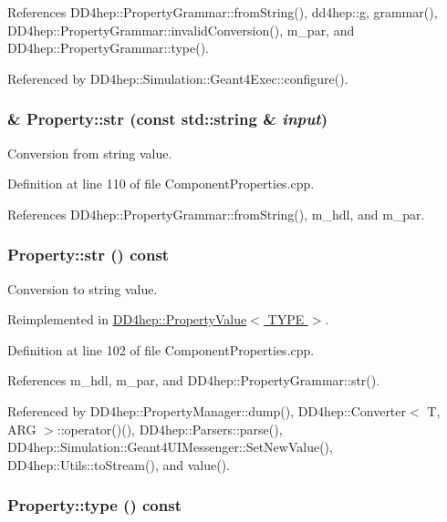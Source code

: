 References DD4hep::PropertyGrammar::fromString(), dd4hep::g, grammar(), DD4hep::PropertyGrammar::invalidConversion(), m\_\-par, and DD4hep::PropertyGrammar::type().

Referenced by DD4hep::Simulation::Geant4Exec::configure().\hypertarget{class_d_d4hep_1_1_property_a4f4d25269959d15fb6b6c9cf581ee2a4}{
\subsubsection[{str}]{ \& Property::str (const std::string \& {\em input})}}
\label{class_d_d4hep_1_1_property_a4f4d25269959d15fb6b6c9cf581ee2a4}


Conversion from string value. 

Definition at line 110 of file ComponentProperties.cpp.

References DD4hep::PropertyGrammar::fromString(), m\_\-hdl, and m\_\-par.\hypertarget{class_d_d4hep_1_1_property_aed04b1176882fe335eb03a2044bc1cf2}{
\subsubsection[{str}]{ Property::str () const}}
\label{class_d_d4hep_1_1_property_aed04b1176882fe335eb03a2044bc1cf2}


Conversion to string value. 

Reimplemented in \hyperlink{class_d_d4hep_1_1_property_value_aee9a0afd8a49155741da905fdadbbc91}{DD4hep::PropertyValue$<$ TYPE $>$}.

Definition at line 102 of file ComponentProperties.cpp.

References m\_\-hdl, m\_\-par, and DD4hep::PropertyGrammar::str().

Referenced by DD4hep::PropertyManager::dump(), DD4hep::Converter$<$ T, ARG $>$::operator()(), DD4hep::Parsers::parse(), DD4hep::Simulation::Geant4UIMessenger::SetNewValue(), DD4hep::Utils::toStream(), and value().\hypertarget{class_d_d4hep_1_1_property_a381f22fbb525bd5d039258b126d63276}{
\subsubsection[{type}]{ Property::type () const}}
\label{class_d_d4hep_1_1_property_a381f22fbb525bd5d039258b126d63276}


